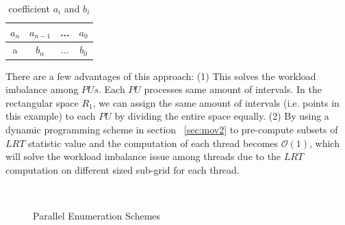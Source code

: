 \documentclass[AMA,LATO1COL]{WileyNJD-v2}
\newcommand\bigo{\mathcal O}
\begin{document}
 \begin{table}[t]
\centering \caption{ coefficient $a_i$ and $b_i$ \label{tab:coff}}
     \begin{tabular}{|c|c|c|c|}
	\hline
    $a_n$  &  $a_{n-1}$ &...& $a_0$ \\
	\hline
    a  &  $b_n$ &...&$b_0$  \\
    \hline
\end{tabular}
\label{lrt-compute}
\end{table}

There are a few advantages of this approach: (1) This solves the workload imbalance among $PUs$. Each $PU$ processes same amount of intervals. In the rectangular space $R_1$, we can assign the same amount of intervals (i.e. points in this example) to each $PU$ by dividing the entire space equally. (2) By using a dynamic programming scheme in section ~\ref{sec:mov2} to pre-compute subsets of $LRT$ statistic value and the computation of each thread becomes $\bigo(1)$, which will solve the workload imbalance issue among threads due to the $LRT$ computation on different sized sub-grid for each thread.

\begin{figure}[t]
\centering
{}
~~\\
\caption{Parallel Enumeration Schemes\label{example1}}
\end{figure}
\end{document}
